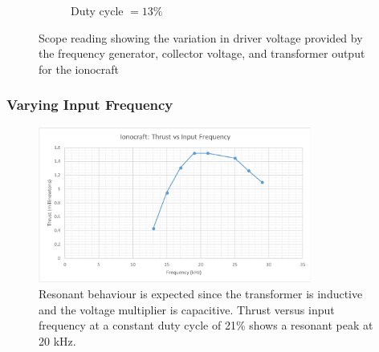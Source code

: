 \documentclass[11pt]{article}
\begin{document}
\begin{figure}[h!]
\begin{subfigure}{0.49\textwidth}
\caption{Duty cycle $=13\%$}
\label{fig:craft_sc_23}
\end{subfigure}
\caption{\label{fig:thruster_duty} Scope reading showing the variation in driver voltage provided by the frequency generator, collector voltage, and transformer output for the ionocraft}
\end{figure}

\pagebreak
\subsubsection{Varying Input Frequency}

\begin{figure}[h!]
\centering
\includegraphics[width = 0.8\textwidth]{craft_g3}
\caption{\label{fig:craft_g3} Resonant behaviour is expected since the transformer is inductive and the voltage multiplier is capacitive. Thrust versus input frequency at a constant duty cycle of 21\% shows a resonant peak at 20 kHz.}
\end{figure}
\end{document}
